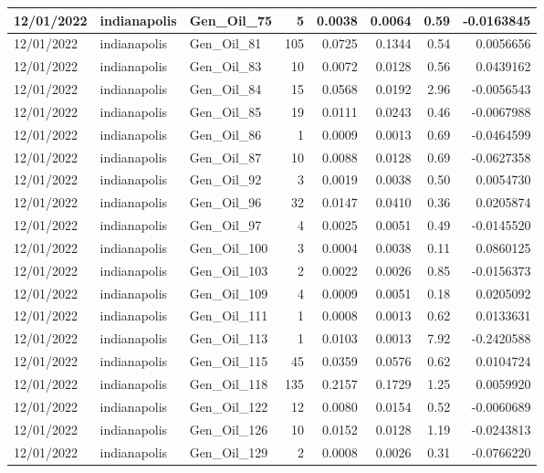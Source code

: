 \documentclass[
  letterpaper,
  DIV=11,
  numbers=noendperiod]{scrartcl}
\begin{document}
\begin{tabular}{l|l|l|r|r|r|r|r}
\hline
12/01/2022 & indianapolis & Gen\_Oil\_75 & 5 & 0.0038 & 0.0064 & 0.59 & -0.0163845\\
\hline
12/01/2022 & indianapolis & Gen\_Oil\_81 & 105 & 0.0725 & 0.1344 & 0.54 & 0.0056656\\
\hline
12/01/2022 & indianapolis & Gen\_Oil\_83 & 10 & 0.0072 & 0.0128 & 0.56 & 0.0439162\\
\hline
12/01/2022 & indianapolis & Gen\_Oil\_84 & 15 & 0.0568 & 0.0192 & 2.96 & -0.0056543\\
\hline
12/01/2022 & indianapolis & Gen\_Oil\_85 & 19 & 0.0111 & 0.0243 & 0.46 & -0.0067988\\
\hline
12/01/2022 & indianapolis & Gen\_Oil\_86 & 1 & 0.0009 & 0.0013 & 0.69 & -0.0464599\\
\hline
12/01/2022 & indianapolis & Gen\_Oil\_87 & 10 & 0.0088 & 0.0128 & 0.69 & -0.0627358\\
\hline
12/01/2022 & indianapolis & Gen\_Oil\_92 & 3 & 0.0019 & 0.0038 & 0.50 & 0.0054730\\
\hline
12/01/2022 & indianapolis & Gen\_Oil\_96 & 32 & 0.0147 & 0.0410 & 0.36 & 0.0205874\\
\hline
12/01/2022 & indianapolis & Gen\_Oil\_97 & 4 & 0.0025 & 0.0051 & 0.49 & -0.0145520\\
\hline
12/01/2022 & indianapolis & Gen\_Oil\_100 & 3 & 0.0004 & 0.0038 & 0.11 & 0.0860125\\
\hline
12/01/2022 & indianapolis & Gen\_Oil\_103 & 2 & 0.0022 & 0.0026 & 0.85 & -0.0156373\\
\hline
12/01/2022 & indianapolis & Gen\_Oil\_109 & 4 & 0.0009 & 0.0051 & 0.18 & 0.0205092\\
\hline
12/01/2022 & indianapolis & Gen\_Oil\_111 & 1 & 0.0008 & 0.0013 & 0.62 & 0.0133631\\
\hline
12/01/2022 & indianapolis & Gen\_Oil\_113 & 1 & 0.0103 & 0.0013 & 7.92 & -0.2420588\\
\hline
12/01/2022 & indianapolis & Gen\_Oil\_115 & 45 & 0.0359 & 0.0576 & 0.62 & 0.0104724\\
\hline
12/01/2022 & indianapolis & Gen\_Oil\_118 & 135 & 0.2157 & 0.1729 & 1.25 & 0.0059920\\
\hline
12/01/2022 & indianapolis & Gen\_Oil\_122 & 12 & 0.0080 & 0.0154 & 0.52 & -0.0060689\\
\hline
12/01/2022 & indianapolis & Gen\_Oil\_126 & 10 & 0.0152 & 0.0128 & 1.19 & -0.0243813\\
\hline
12/01/2022 & indianapolis & Gen\_Oil\_129 & 2 & 0.0008 & 0.0026 & 0.31 & -0.0766220\\

\end{tabular}
\end{document}

